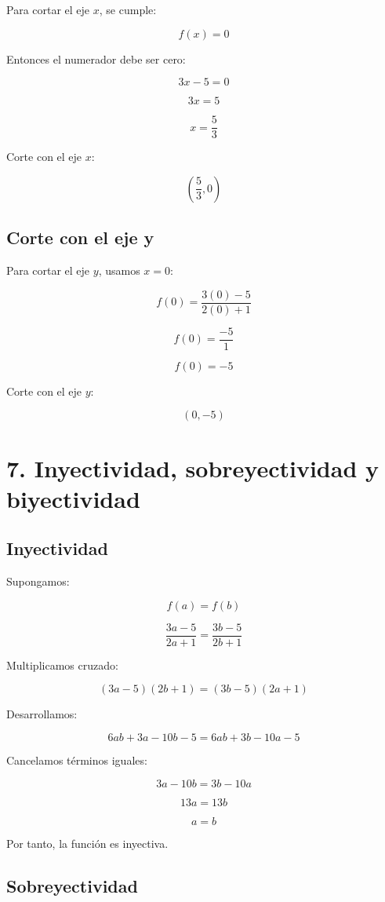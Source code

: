 \documentclass[12pt,a4paper]{article}
\begin{document}
	Para cortar el eje $x$, se cumple:
	
	\[
	f(x)=0
	\]
	
	Entonces el numerador debe ser cero:
	
	\[
	3x-5=0
	\]
	
	\[
	3x=5
	\]
	
	\[
	x=\frac{5}{3}
	\]
	
	Corte con el eje $x$:
	
	\[
	\left(\frac{5}{3},0\right)
	\]
	
	\subsection*{Corte con el eje y}
	
	Para cortar el eje $y$, usamos $x=0$:
	
	\[
	f(0)=\frac{3(0)-5}{2(0)+1}
	\]
	
	\[
	f(0)=\frac{-5}{1}
	\]
	
	\[
	f(0)=-5
	\]
	
	Corte con el eje $y$:
	
	\[
	(0,-5)
	\]
	
	\section*{7. Inyectividad, sobreyectividad y biyectividad}
	
	\subsection*{Inyectividad}
	
	Supongamos:
	
	\[
	f(a)=f(b)
	\]
	
	\[
	\frac{3a-5}{2a+1}=\frac{3b-5}{2b+1}
	\]
	
	Multiplicamos cruzado:
	
	\[
	(3a-5)(2b+1)=(3b-5)(2a+1)
	\]
	
	Desarrollamos:
	
	\[
	6ab+3a-10b-5=6ab+3b-10a-5
	\]
	
	Cancelamos términos iguales:
	
	\[
	3a-10b=3b-10a
	\]
	
	\[
	13a=13b
	\]
	
	\[
	a=b
	\]
	
	Por tanto, la función es inyectiva.
	
	\subsection*{Sobreyectividad}
	
\end{document}

